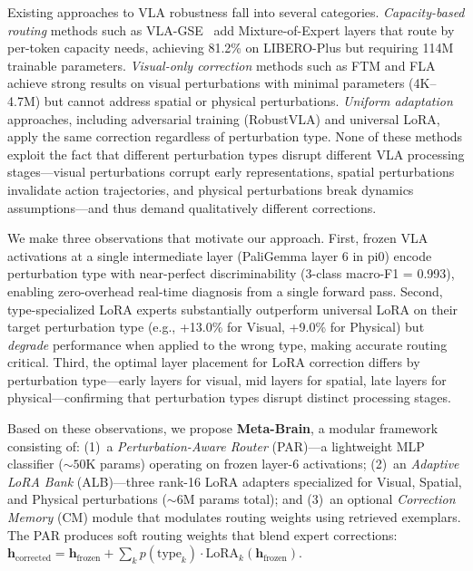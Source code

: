 \documentclass[letterpaper]{article}
\begin{document}
Existing approaches to VLA robustness fall into several categories.
\emph{Capacity-based routing} methods such as VLA-GSE~\cite{vla-gse} add Mixture-of-Expert layers that route by per-token capacity needs, achieving 81.2\% on LIBERO-Plus but requiring 114M trainable parameters.
\emph{Visual-only correction} methods such as FTM and FLA achieve strong results on visual perturbations with minimal parameters (4K--4.7M) but cannot address spatial or physical perturbations.
\emph{Uniform adaptation} approaches, including adversarial training (RobustVLA) and universal LoRA, apply the same correction regardless of perturbation type.
None of these methods exploit the fact that different perturbation types disrupt different VLA processing stages---visual perturbations corrupt early representations, spatial perturbations invalidate action trajectories, and physical perturbations break dynamics assumptions---and thus demand qualitatively different corrections.

We make three observations that motivate our approach.
First, frozen VLA activations at a single intermediate layer (PaliGemma layer 6 in pi0) encode perturbation type with near-perfect discriminability (3-class macro-F1 = 0.993), enabling zero-overhead real-time diagnosis from a single forward pass.
Second, type-specialized LoRA experts substantially outperform universal LoRA on their target perturbation type (e.g., +13.0\% for Visual, +9.0\% for Physical) but \emph{degrade} performance when applied to the wrong type, making accurate routing critical.
Third, the optimal layer placement for LoRA correction differs by perturbation type---early layers for visual, mid layers for spatial, late layers for physical---confirming that perturbation types disrupt distinct processing stages.

Based on these observations, we propose \textbf{Meta-Brain}, a modular framework consisting of:
(1)~a \emph{Perturbation-Aware Router} (PAR)---a lightweight MLP classifier (${\sim}50$K params) operating on frozen layer-6 activations;
(2)~an \emph{Adaptive LoRA Bank} (ALB)---three rank-16 LoRA adapters specialized for Visual, Spatial, and Physical perturbations (${\sim}6$M params total);
and (3)~an optional \emph{Correction Memory} (CM) module that modulates routing weights using retrieved exemplars.
The PAR produces soft routing weights that blend expert corrections: $\mathbf{h}_{\text{corrected}} = \mathbf{h}_{\text{frozen}} + \sum_k p(\text{type}_k) \cdot \text{LoRA}_k(\mathbf{h}_{\text{frozen}})$.
\end{document}
